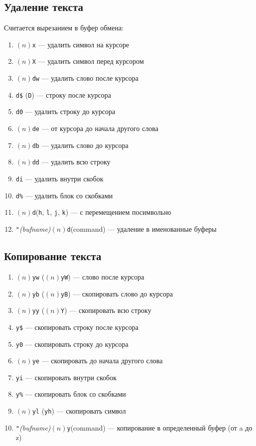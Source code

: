 \documentclass[a4paper,10pt, twocolumn]{article}
\newcommand*{\cod}[1]{\texttt{#1}}
\begin{document}
\subsection{Удаление текста}
Считается вырезанием в буфер обмена:
\begin{enumerate}
    \item $(n)$\cod{x} --- удалить символ на курсоре
    \item $(n)$\cod{X} --- удалить символ перед курсором
    \item $(n)$\cod{dw} --- удалить слово после курсора
    \item \cod{d\$} (\cod{D}) --- строку после курсора
    \item \cod{d0} --- удалить строку до курсора
    \item $(n)$\cod{de} --- от курсора до начала другого слова
    \item $(n)$\cod{db} --- удалить слово до курсора
    \item $(n)$\cod{dd} --- удалить всю строку
    \item \cod{di} --- удалить внутри скобок
    \item \cod{d\%} --- удалить блок со скобками
    \item $(n)$\cod{d}(\cod{h}, \cod{l}, \cod{j}, \cod{k}) --- с перемещением посимвольно
    \item \cod{"}\textit{(bufname)}$(n)$\cod{d}(command) --- удаление в именованные буферы
\end{enumerate}

\subsection{Копирование текста}
\begin{enumerate}
    \item $(n)$\cod{yw} ($(n)$\cod{yW}) --- слово после курсора
    \item $(n)$\cod{yb} ($(n)$\cod{yB}) --- скопировать слово до курсора
    \item $(n)$\cod{yy} ($(n)$\cod{Y}) --- скопировать всю строку
    \item \cod{y\$} --- скопировать строку после курсора
    \item \cod{y0} --- скопировать строку до курсора
    \item $(n)$\cod{ye} --- скопировать до начала другого слова
    \item \cod{yi} --- скопировать внутри скобок
    \item \cod{y\%} --- скопировать блок со скобками
    \item $(n)$\cod{yl} (\cod{yh}) --- скопировать символ
    \item \cod{"}\textit{(bufname)}$(n)$\cod{y}(command) --- копирование в определенный буфер (от a до z)
\end{enumerate}
\end{document}
